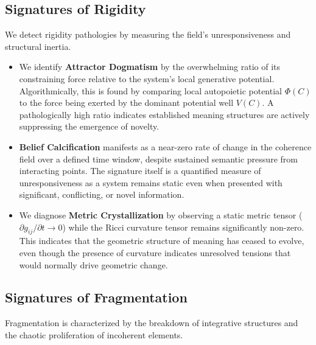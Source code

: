 \subsection{Signatures of Rigidity}
\label{16.2.1:signatures_of_rigidity}

We detect rigidity pathologies by measuring the field's unresponsiveness and structural inertia.

\begin{itemize}

    \item We identify \textbf{Attractor Dogmatism} by the overwhelming ratio of its constraining force relative to the system's local generative potential. Algorithmically, this is found by comparing local autopoietic potential \(\Phi(C)\) to the force being exerted by the dominant potential well \(V(C)\). A pathologically high ratio indicates established meaning structures are actively suppressing the emergence of novelty.

    \item \textbf{Belief Calcification} manifests as a near-zero rate of change in the coherence field over a defined time window, despite sustained semantic pressure from interacting points. The signature itself is a quantified measure of unresponsiveness as a system remains static even when presented with significant, conflicting, or novel information.

    \item We diagnose \textbf{Metric Crystallization} by observing a static metric tensor (\(\partial g_{ij} / \partial t \to 0\)) while the Ricci curvature tensor remains significantly non-zero. This indicates that the geometric structure of meaning has ceased to evolve, even though the presence of curvature indicates unresolved tensions that would normally drive geometric change.

\end{itemize}



\subsection{Signatures of Fragmentation}
\label{16.2.2:signatures_of_fragmentation}

Fragmentation is characterized by the breakdown of integrative structures and the chaotic proliferation of incoherent elements.

